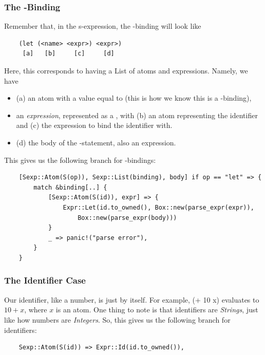 \subsubsection{The -Binding}
Remember that, in the s-expression, the -binding will look like 
\begin{verbatim}
    (let (<name> <expr>) <expr>)
     [a]   [b]     [c]     [d]\end{verbatim}
Here, this corresponds to having a List of atoms and expressions. Namely, we have 
\begin{itemize}
    \item (a) an atom with a  value equal to  (this is how we know this is a -binding),
    \item an \emph{expression}, represented as a , with (b) an atom representing the identifier and (c) the expression to bind the identifier with.
    \item (d) the body of the -statement, also an expression.
\end{itemize}

This gives us the following branch for -bindings:
\begin{verbatim}
    [Sexp::Atom(S(op)), Sexp::List(binding), body] if op == "let" => {
        match &binding[..] {
            [Sexp::Atom(S(id)), expr] => {
                Expr::Let(id.to_owned(), Box::new(parse_expr(expr)),
                    Box::new(parse_expr(body)))
            }
            _ => panic!("parse error"),
        }
    }\end{verbatim}

\subsubsection{The Identifier Case}
Our identifier, like a number, is just by itself. For example, \code(+ 10 x) evaluates to $10 + x$, where $x$ is an atom. One thing to note is that identifiers are \emph{Strings}, just like how numbers are \emph{Integers}. So, this gives us the following branch for identifiers:
\begin{verbatim}
    Sexp::Atom(S(id)) => Expr::Id(id.to_owned()),\end{verbatim}


